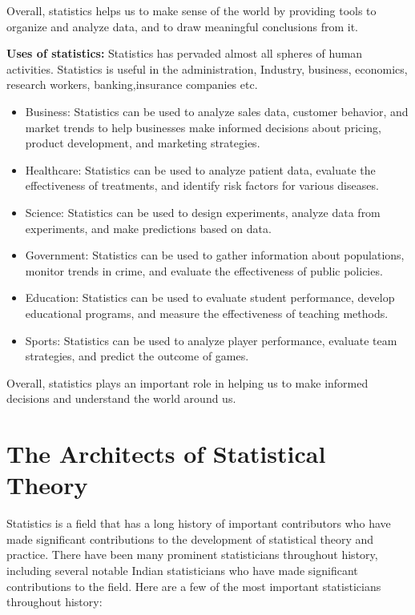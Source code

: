 \documentclass[
]{book}
\begin{document}
Overall, statistics helps us to make sense of the world by providing tools to organize and analyze data, and to draw meaningful conclusions from it.

\textbf{Uses of statistics:} Statistics has pervaded almost all spheres of
human activities. Statistics is useful in the administration, Industry,
business, economics, research workers, banking,insurance companies etc.

\begin{itemize}
\item
  Business: Statistics can be used to analyze sales data, customer behavior, and market trends to help businesses make informed decisions about pricing, product development, and marketing strategies.
\item
  Healthcare: Statistics can be used to analyze patient data, evaluate the effectiveness of treatments, and identify risk factors for various diseases.\\
\item
  Science: Statistics can be used to design experiments, analyze data from experiments, and make predictions based on data.
\item
  Government: Statistics can be used to gather information about populations, monitor trends in crime, and evaluate the effectiveness of public policies.
\item
  Education: Statistics can be used to evaluate student performance, develop educational programs, and measure the effectiveness of teaching methods.
\item
  Sports: Statistics can be used to analyze player performance, evaluate team strategies, and predict the outcome of games.
\end{itemize}

Overall, statistics plays an important role in helping us to make informed decisions and understand the world around us.

\hypertarget{the-architects-of-statistical-theory}{%
\section{The Architects of Statistical Theory}\label{the-architects-of-statistical-theory}}

Statistics is a field that has a long history of important contributors who have made significant contributions to the development of statistical theory and practice. There have been many prominent statisticians throughout history, including several notable Indian statisticians who have made significant contributions to the field. Here are a few of the most important statisticians throughout history:
\end{document}
